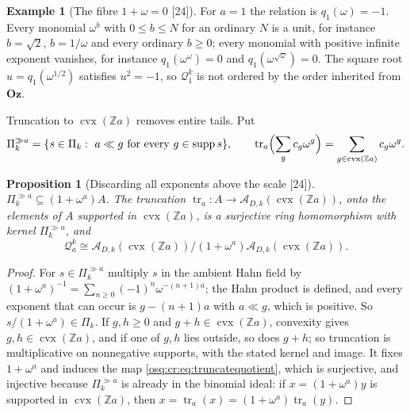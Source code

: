 \documentclass[11pt,letterpaper]{article}
\numberwithin{equation}{section}
\newtheorem{proposition}[proposition]{Proposition}
\theoremstyle{definition}
\newtheorem{example}[example]{Example}
\theoremstyle{remark}
\theoremstyle{plain}
\newcommand{\Oz}{\mathbf{Oz}}
\newcommand{\Z}{\mathbb Z}
\newcommand{\A}{\mathcal A}          %
\newcommand{\Qa}{\mathcal Q}         %
\newcommand{\supp}{\operatorname{supp}}
\newcommand{\src}[1]{\textup{\textsf{[#1]}}}
\begin{document}
\begin{example}[The fibre $1+\omega=0$ \src{24}]\label{osq:cr:ex:omega}
For $a=1$ the relation is $q_1(\omega)=-1$. Every monomial $\omega^b$ with $0\le b\le N$ for an ordinary $N$ is a unit, for instance $b=\sqrt2$,
$b=1/\omega$ and every ordinary $b\ge0$; every monomial with positive infinite exponent vanishes, for instance $q_1(\omega^\omega)=0$ and
$q_1(\omega^{\sqrt\omega})=0$. The square root $u=q_1(\omega^{1/2})$ satisfies $u^2=-1$, so $\Qa^k_1$ is not ordered by the order inherited from $\Oz$.
\end{example}

Truncation to $\operatorname{cvx}(\Z a)$ removes entire tails. Put
\begin{equation}\label{osq:cr:eq:tails}
 \Pi_k^{\gg a}=\{s\in\Pi_k:\ a\ll g\text{ for every }g\in\supp s\},\qquad
 \operatorname{tr}_a\Bigl(\sum_gc_g\omega^g\Bigr)=\sum_{g\in\operatorname{cvx}(\Z a)}c_g\omega^g .
\end{equation}

\begin{proposition}[Discarding all exponents above the scale \src{24}]\label{osq:cr:prop:tails}
$\Pi_k^{\gg a}\subseteq(1+\omega^a)A$. The truncation $\operatorname{tr}_a:A\to\A_{D,k}(\operatorname{cvx}(\Z a))$, onto the elements of $A$ supported in
$\operatorname{cvx}(\Z a)$, is a surjective ring homomorphism with kernel $\Pi_k^{\gg a}$, and
\begin{equation}\label{osq:cr:eq:truncatequotient}
 \Qa^k_a\cong\A_{D,k}(\operatorname{cvx}(\Z a))/(1+\omega^a)\A_{D,k}(\operatorname{cvx}(\Z a)).
\end{equation}
\end{proposition}
\begin{proof}
For $s\in\Pi_k^{\gg a}$ multiply $s$ in the ambient Hahn field by $(1+\omega^a)^{-1}=\sum_{n\ge0}(-1)^n\omega^{-(n+1)a}$; the Hahn product is defined,
and every exponent that can occur is $g-(n+1)a$ with $a\ll g$, which is positive. So $s/(1+\omega^a)\in\Pi_k$. If $g,h\ge0$ and $g+h\in
\operatorname{cvx}(\Z a)$, convexity gives $g,h\in\operatorname{cvx}(\Z a)$, and if one of $g,h$ lies outside, so does $g+h$; so truncation is
multiplicative on nonnegative supports, with the stated kernel and image. It fixes $1+\omega^a$ and induces the map \eqref{osq:cr:eq:truncatequotient},
which is surjective, and injective because $\Pi_k^{\gg a}$ is already in the binomial ideal: if $x=(1+\omega^a)y$ is supported in
$\operatorname{cvx}(\Z a)$, then $x=\operatorname{tr}_a(x)=(1+\omega^a)\operatorname{tr}_a(y)$.
\end{proof}
\end{document}
